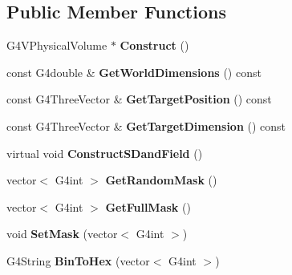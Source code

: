 \subsection*{Public Member Functions}
\begin{DoxyCompactItemize}
\item 
\hypertarget{class_detector_construction_a662c618480b345a747f014b845d5ffdf}{}\label{class_detector_construction_a662c618480b345a747f014b845d5ffdf} 
G4\+V\+Physical\+Volume $\ast$ {\bfseries Construct} ()
\item 
\hypertarget{class_detector_construction_a95c3a4dc131ffdf4cc575b3969f32761}{}\label{class_detector_construction_a95c3a4dc131ffdf4cc575b3969f32761} 
const G4double \& {\bfseries Get\+World\+Dimensions} () const
\item 
\hypertarget{class_detector_construction_a6a1e35c537ff4b9008c179e8fb13e376}{}\label{class_detector_construction_a6a1e35c537ff4b9008c179e8fb13e376} 
const G4\+Three\+Vector \& {\bfseries Get\+Target\+Position} () const
\item 
\hypertarget{class_detector_construction_a507c12633a16921409ad3435b2eca02d}{}\label{class_detector_construction_a507c12633a16921409ad3435b2eca02d} 
const G4\+Three\+Vector \& {\bfseries Get\+Target\+Dimension} () const
\item 
\hypertarget{class_detector_construction_aa88426683f97c31c8053004bd6952751}{}\label{class_detector_construction_aa88426683f97c31c8053004bd6952751} 
virtual void {\bfseries Construct\+S\+Dand\+Field} ()
\item 
\hypertarget{class_detector_construction_a13b7d1b5ce00cc50f810d507c3e2fb75}{}\label{class_detector_construction_a13b7d1b5ce00cc50f810d507c3e2fb75} 
vector$<$ G4int $>$ {\bfseries Get\+Random\+Mask} ()
\item 
\hypertarget{class_detector_construction_a6ec732600c5b5f387a447fc1377d9fd8}{}\label{class_detector_construction_a6ec732600c5b5f387a447fc1377d9fd8} 
vector$<$ G4int $>$ {\bfseries Get\+Full\+Mask} ()
\item 
\hypertarget{class_detector_construction_ac719dce27c524cc9b99e90b5b3296eca}{}\label{class_detector_construction_ac719dce27c524cc9b99e90b5b3296eca} 
void {\bfseries Set\+Mask} (vector$<$ G4int $>$)
\item 
\hypertarget{class_detector_construction_a7a3259a049a631293a36d2ee143ae6ff}{}\label{class_detector_construction_a7a3259a049a631293a36d2ee143ae6ff} 
G4\+String {\bfseries Bin\+To\+Hex} (vector$<$ G4int $>$)
\item 
\hypertarget{class_detector_construction_a47c0235d84d71a08ad014a794d4e8899}{}\label{class_detector_construction_a47c0235d84d71a08ad014a794d4e8899} 

\end{DoxyCompactItemize}
